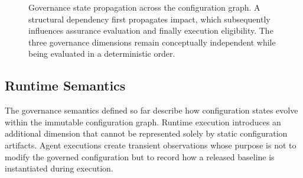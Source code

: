 \documentclass[10pt]{article}
\begin{document}
\begin{figure}[t]

\caption{Governance state propagation across the configuration graph.
A structural dependency first propagates impact, which subsequently influences
assurance evaluation and finally execution eligibility. The three governance
dimensions remain conceptually independent while being evaluated in a
deterministic order.}
\label{fig:governance_propagation}
\end{figure}

\subsection{Runtime Semantics}
\label{subsec:runtime_semantics}

The governance semantics defined so far describe how configuration states evolve
within the immutable configuration graph. Runtime execution introduces an
additional dimension that cannot be represented solely by static configuration
artifacts. Agent executions create transient observations whose purpose is not
to modify the governed configuration but to record how a released baseline is
instantiated during execution.
\end{document}
